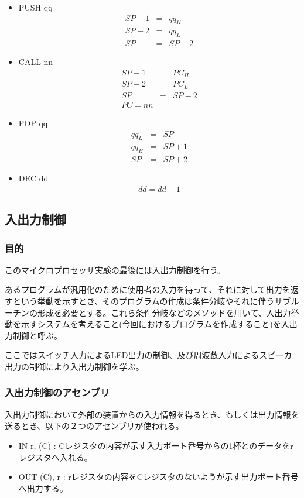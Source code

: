 \documentclass[11pt,a4j]{jsarticle}
\begin{document}
   \begin{itemize}
   \item PUSH qq
   \begin{eqnarray}
   SP - 1 &=& qq_H \nonumber \\
   SP - 2 &=& qq_L \nonumber \\
   SP &=& SP - 2 \nonumber
   \end{eqnarray}
   \item CALL nn
   \begin{eqnarray}
   SP - 1 &=& PC_H \nonumber \\
   SP - 2 &=& PC_L \nonumber \\
   SP &=& SP - 2 \nonumber \\
   PC = nn \nonumber
   \end{eqnarray}
   \item POP qq
   \begin{eqnarray}
   qq_L &=& SP \nonumber \\
   qq_H &=& SP + 1 \nonumber \\
   SP &=& SP + 2 \nonumber
   \end{eqnarray}
   \item DEC dd
   \begin{eqnarray}
   dd = dd - 1 \nonumber
   \end{eqnarray}
   
   \end{itemize}
   
   
  \subsection{入出力制御}
   
   \subsubsection{目的}
   このマイクロプロセッサ実験の最後には入出力制御を行う。
   
   あるプログラムが汎用化のために使用者の入力を待って、それに対して出力を返すという挙動を示すとき、そのプログラムの作成は条件分岐やそれに伴うサブルーチンの形成を必要とする。これら条件分岐などのメソッドを用いて、入出力挙動を示すシステムを考えること(今回におけるプログラムを作成すること)を入出力制御と呼ぶ。
   
   ここではスイッチ入力によるLED出力の制御、及び周波数入力によるスピーカ出力の制御により入出力制御を学ぶ。
   
   \subsubsection{入出力制御のアセンブリ}
   入出力制御において外部の装置からの入力情報を得るとき、もしくは出力情報を送るとき、以下の２つのアセンブリが使われる。
   \begin{itemize}
   \item IN r, (C) : Cレジスタの内容が示す入力ポート番号からの1杯とのデータをrレジスタへ入れる。
   \item OUT (C), r : rレジスタの内容をCレジスタのないようが示す出力ポート番号へ出力する。
   \end{itemize}
  
\end{document}
